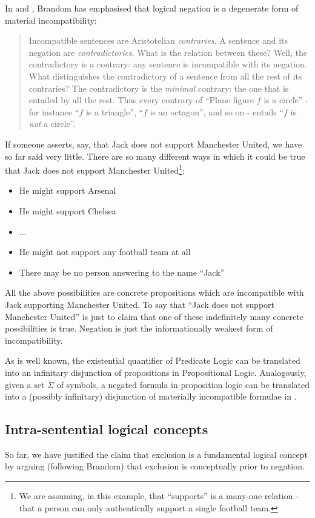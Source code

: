 In \cite{brandom2} and \cite{brandom}, Brandom has emphasised that logical negation is a degenerate form of material incompatibility:
\begin{quote}
Incompatible sentences are Aristotelian \emph{contraries}. A sentence and its negation are \emph{contradictories}. What is the relation between these? Well, the contradictory is a contrary: any sentence is incompatible with its negation. What distinguishes the contradictory of a sentence  from all the rest of its contraries? The contradictory is the \emph{minimal} contrary: the one that is entailed by all the rest. Thus every contrary of ``Plane figure $f$ is a circle'' - for instance ``$f$ is a triangle'', ``$f$ is an octagon'', and so on - entails ``$f$ is \emph{not} a circle''.
\end{quote}

If someone asserts, say, that Jack does not support Manchester United, we have so far said very little.  
There are so many different ways in which it could be true that Jack does not support Manchester United\footnote{We are assuming, in this example, that ``supports'' is a many-one relation - that a person can only authentically support a single football team.}:
\begin{itemize}
\item
He might support Arsenal
\item
He might support Chelsea
\item
...
\item
He might not support any football team at all
\item
There may be no person answering to the name ``Jack''
\end{itemize}
All the above possibilities are concrete propositions which are incompatible with Jack supporting Manchester United.
To say that ``Jack does not support Manchester United'' is just to claim that one of these indefinitely many concrete possibilities is true.
Negation is just the informationally weakest form of incompatibility.

As is well known, the existential quantifier of Predicate Logic can be translated into an infinitary disjunction of propositions in Propositional Logic.
Analogously, given a set $\Sigma$ of symbols, a negated formula in proposition logic can be translated into a (possibly infinitary)
disjunction of materially incompatible formulae in \ELFULL{}.

\subsection{Intra-sentential logical concepts}
\label{intrasentential}
So far, we have justified the claim that exclusion is a fundamental logical concept by arguing (following Brandom) that exclusion is conceptually prior to negation. 

